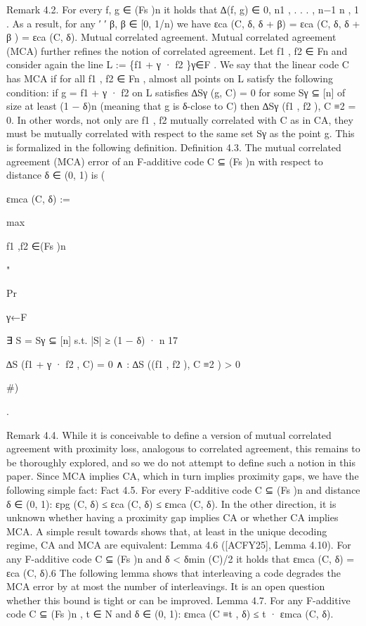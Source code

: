 \documentclass[11pt]{article}
\begin{document}
Remark 4.2. For every f, g ∈ (Fs )n it holds that ∆(f, g) ∈ 0, n1 , . . . , n−1
n , 1 . As a result, for any
′
′
β, β ∈ [0, 1/n) we have εca (C, δ, δ + β) = εca (C, δ, δ + β ) = εca (C, δ).
Mutual correlated agreement. Mutual correlated agreement (MCA) further refines the notion
of correlated agreement. Let f1 , f2 ∈ Fn and consider again the line L := \{f1 + γ · f2 \}γ∈F . We say
that the linear code C has MCA if for all f1 , f2 ∈ Fn , almost all points on L satisfy the following
condition: if g = f1 + γ · f2 on L satisfies ∆Sγ (g, C) = 0 for some Sγ ⊆ [n] of size at least (1 − δ)n
(meaning that g is δ-close to C) then ∆Sγ (f1 , f2 ), C ≡2 = 0. In other words, not only are f1 , f2
mutually correlated with C as in CA, they must be mutually correlated with respect to the same
set Sγ as the point g. This is formalized in the following definition.
Definition 4.3. The mutual correlated agreement (MCA) error of an F-additive code C ⊆
(Fs )n with respect to distance δ ∈ (0, 1) is
(

εmca (C, δ) :=

max

f1 ,f2 ∈(Fs )n

"

Pr

γ←F

∃ S = Sγ ⊆ [n] s.t.
|S| ≥ (1 − δ) · n
17

∆S (f1 + γ · f2 , C) = 0 ∧
:
∆S ((f1 , f2 ), C ≡2 ) > 0

\#)

.

Remark 4.4. While it is conceivable to define a version of mutual correlated agreement with
proximity loss, analogous to correlated agreement, this remains to be thoroughly explored, and so
we do not attempt to define such a notion in this paper.
Since MCA implies CA, which in turn implies proximity gaps, we have the following simple fact:
Fact 4.5. For every F-additive code C ⊆ (Fs )n and distance δ ∈ (0, 1):
εpg (C, δ) ≤ εca (C, δ) ≤ εmca (C, δ).
In the other direction, it is unknown whether having a proximity gap implies CA or whether CA
implies MCA. A simple result towards shows that, at least in the unique decoding regime, CA and
MCA are equivalent:
Lemma 4.6 ([ACFY25], Lemma 4.10). For any F-additive code C ⊆ (Fs )n and δ < δmin (C)/2 it
holds that εmca (C, δ) = εca (C, δ).6
The following lemma shows that interleaving a code degrades the MCA error by at most the
number of interleavings. It is an open question whether this bound is tight or can be improved.
Lemma 4.7. For any F-additive code C ⊆ (Fs )n , t ∈ N and δ ∈ (0, 1): εmca (C ≡t , δ) ≤ t · εmca (C, δ).
\end{document}
